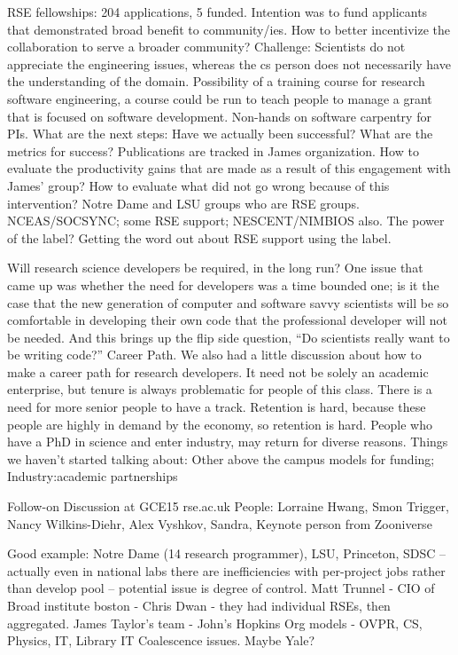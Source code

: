RSE fellowships: 204 applications, 5 funded. Intention was to fund applicants that demonstrated broad benefit to community/ies. How to better incentivize the collaboration to serve a broader community? Challenge: Scientists do not appreciate the engineering issues, whereas the cs person does not necessarily have the understanding of the domain. 
Possibility of a training course for research software engineering, a course could be run to teach people to manage a grant that is focused on software development. Non-hands on software carpentry for PIs.
What are the next steps:
Have we actually been successful?
What are the metrics for success?
Publications are tracked in James organization.
How to evaluate the productivity gains that are made as a result of this engagement with James’ group?
How to evaluate what did not go wrong because of this intervention?
Notre Dame and LSU groups who are RSE groups.
NCEAS/SOCSYNC; some RSE support; NESCENT/NIMBIOS also.
The power of the label? Getting the word out about RSE support using the label.
 

 
 
 
 
 
 	
Will research science developers be required, in the long run?
One issue that came up was whether the need for developers was a time bounded one; is it the case that the new generation of computer and software savvy scientists will be so comfortable in developing their own code that the professional developer will not be needed.  And this brings up the flip side question, “Do scientists really want to be writing code?”
Career Path.
We also had a little discussion about how to make a career path for research developers. It need not be solely an academic enterprise, but tenure is always problematic for people of this class. There is a need for more senior people to have a track. Retention is hard, because these people are highly in demand by the economy, so retention is hard. People who have a PhD in science and enter industry, may return for diverse reasons.
Things we haven’t started talking about:
Other above the campus models for funding;
Industry:academic partnerships


Follow-on Discussion at GCE15
rse.ac.uk
People: Lorraine Hwang, Smon Trigger, Nancy Wilkins-Diehr,  Alex Vyshkov, Sandra, Keynote person from Zooniverse  

Good example: Notre Dame (14 research programmer), LSU, Princeton, 
SDSC -- actually even in national labs there are inefficiencies with per-project jobs rather than develop pool -- potential issue is degree of control. 
Matt Trunnel - CIO of Broad institute boston - Chris Dwan - they had individual RSEs, then aggregated. 
James Taylor’s team  - John’s Hopkins
Org models - OVPR, CS, Physics, IT, Library
IT Coalescence issues.
Maybe Yale?



